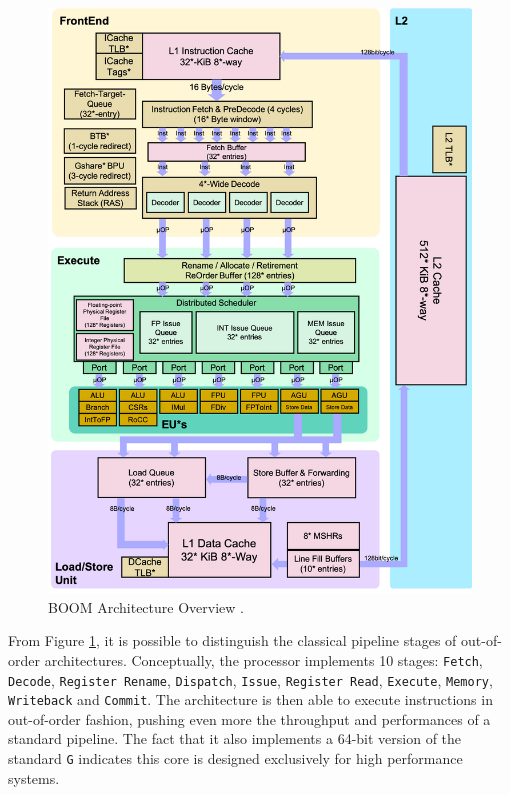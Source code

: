 \begin{figure}[h!]
\centering
\vspace{0.5cm}
\includegraphics[scale=0.2]{./images/boom-core}
\caption{BOOM Architecture Overview \cite{zhaosonicboom}.}
\label{fig:boom} %
\end{figure}

From Figure \ref{fig:boom}, it is possible to distinguish the classical pipeline stages of out-of-order architectures. Conceptually, the processor implements 10 stages: \texttt{Fetch}, \texttt{Decode}, \texttt{Register Rename}, \texttt{Dispatch}, \texttt{Issue}, \texttt{Register Read}, \texttt{Execute}, \texttt{Memory}, \texttt{Writeback} and \texttt{Commit}. The architecture is then able to execute instructions in out-of-order fashion, pushing even more the throughput and performances of a standard pipeline. The fact that it also implements a 64-bit version of the standard \texttt{G} indicates this core is designed exclusively for high performance systems.

